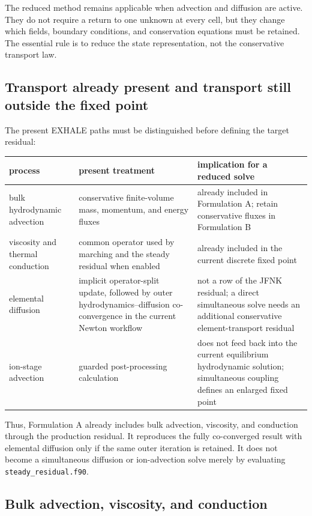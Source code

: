 \documentclass[english,a4paper]{my_memo}
\newcommand{\code}[1]{\texttt{#1}}
\begin{document}
The reduced method remains applicable when advection and diffusion are active.
They do not require a return to one unknown at every cell, but they change which
fields, boundary conditions, and conservation equations must be retained.  The
essential rule is to reduce the state representation, not the conservative
transport law.

\subsection{Transport already present and transport still outside the fixed point}

The present EXHALE paths must be distinguished before defining the target
residual:
\begin{center}\small
\begin{tabular}{@{}p{}p{}p{}@{}}
\toprule
process & present treatment & implication for a reduced solve \\
\midrule
bulk hydrodynamic advection & conservative finite-volume mass, momentum, and
  energy fluxes & already included in Formulation A; retain conservative fluxes
  in Formulation B \\
viscosity and thermal conduction & common operator used by marching and the
  steady residual when enabled & already included in the current discrete fixed
  point \\
elemental diffusion & implicit operator-split update, followed by outer
  hydrodynamics--diffusion co-convergence in the current Newton workflow & not
  a row of the JFNK residual; a direct simultaneous solve needs an additional
  conservative element-transport residual \\
ion-stage advection & guarded post-processing calculation & does not feed back
  into the current equilibrium hydrodynamic solution; simultaneous coupling
  defines an enlarged fixed point \\
\bottomrule
\end{tabular}
\end{center}

Thus, Formulation A already includes bulk advection, viscosity, and conduction
through the production residual.  It reproduces the fully co-converged result
with elemental diffusion only if the same outer iteration is retained.  It does
not become a simultaneous diffusion or ion-advection solve merely by evaluating
\code{steady\_residual.f90}.

\subsection{Bulk advection, viscosity, and conduction}
\end{document}

